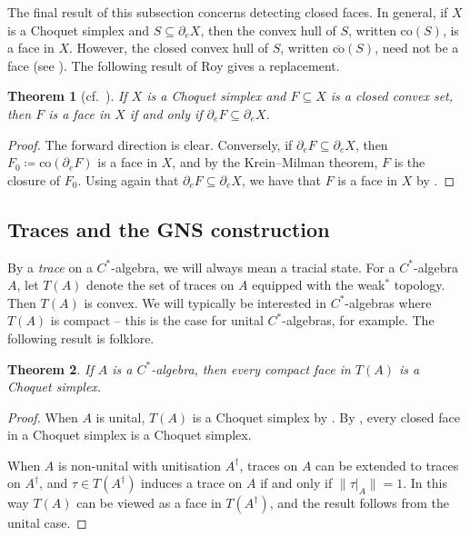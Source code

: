 \documentclass[a4paper,11pt]{amsart}
\newtheorem{theorem}{Theorem}
\theoremstyle{definition}
\numberwithin{equation}{section}
\numberwithin{theorem}{section}
\begin{document}
The final result of this subsection concerns detecting closed faces. In general, if $X$ is a Choquet simplex and $S \subseteq \partial_e X$, then the convex hull of $S$, written  $\mathrm{co}(S)$, is a face in $X$.  However, the closed convex hull of $S$, written $\overline{\mathrm{co}}(S)$, need not be a face (see \cite[Theorem~1]{Alf64}).  The following result of Roy gives a replacement.

\begin{theorem}[{cf.\ \cite[Proposition~4.4]{Roy75}}]\label{thm:choquet-faces}
	If $X$ is a Choquet simplex and $F \subseteq X$ is a closed convex set, then $F$ is a face in $X$ if and only if $\partial_e F \subseteq \partial_e X$.
\end{theorem}

\begin{proof}
	The forward direction is clear.  Conversely, if $\partial_e F \subseteq \partial_e X$, then $F_0 \coloneqq \mathrm{co}(\partial_e F)$ is a face in $X$, and by the Krein--Milman theorem, $F$ is the closure of $F_0$.  Using again that $\partial_e F \subseteq \partial_e X$, we have that $F$ is a face in $X$ by \cite[Proposition~4.4]{Roy75}.
\end{proof}

\subsection{Traces and the GNS construction}\label{sec:traces-prelim}

By a \emph{trace} on a $C^*$-algebra, we will always mean a tracial state.  For a $C^*$-algebra $A$, let $T(A)$ denote the set of traces on $A$ equipped with the weak$^*$ topology.  Then $T(A)$ is convex.  We will typically be interested in $C^*$-algebras where $T(A)$ is compact -- this is the case for unital $C^*$-algebras, for example.  The following result is folklore.

\begin{theorem}\label{thm:traces-choquet}
	If $A$ is a $C^*$-algebra, then every compact face in $T(A)$ is a Choquet simplex.
\end{theorem}

\begin{proof}
When $A$ is unital, $T(A)$ is a Choquet simplex by  \cite[Theorem~3.1.18]{Sak98}.  By \cite[Proposition~10.9]{Go86}, every closed face in a Choquet simplex is a Choquet simplex.

When $A$ is non-unital with unitisation $A^\dagger$, traces on $A$ can be extended to traces on $A^\dagger$, and $\tau\in T(A^\dagger)$ induces a trace on $A$ if and only if $\|\tau|_A\|=1$.  In this way $T(A)$ can be viewed as a face in $T(A^\dagger)$, and the result follows from the unital case.
\end{proof}
\end{document}
